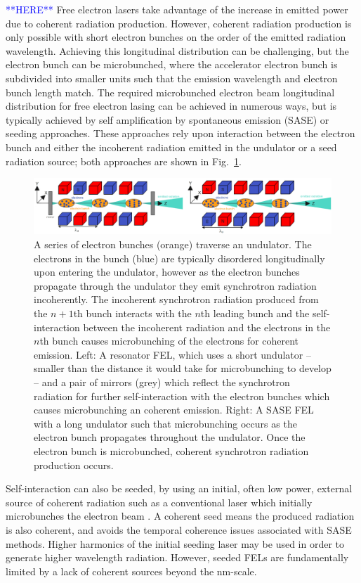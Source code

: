 \documentclass[../main.tex]{subfiles}
\begin{document}
\textcolor{blue}{**HERE**}
Free electron lasers take advantage of the increase in emitted power due to coherent radiation production. However, coherent radiation production is only possible with short electron bunches on the order of the emitted radiation wavelength. Achieving this longitudinal distribution can be challenging, but the electron bunch can be microbunched, where the accelerator electron bunch is subdivided into smaller units such that the emission wavelength and electron bunch length match. The required microbunched electron beam longitudinal distribution for free electron lasing can be achieved in numerous ways, but is typically achieved by self amplification by spontaneous emission (SASE) or seeding approaches. These approaches rely upon interaction between the electron bunch and either the incoherent radiation emitted in the undulator or a seed radiation source; both approaches are shown in Fig.~\ref{fig:FEL_microbunching}.
\begin{figure}[!h]
\centering
\includegraphics[width=\textwidth]{Figures/Introduction/FELs_microbunching.pdf}
\caption{A series of electron bunches (orange) traverse an undulator. The electrons in the bunch (blue) are typically disordered longitudinally upon entering the undulator, however as the electron bunches propagate through the undulator they emit synchrotron radiation incoherently. The incoherent synchrotron radiation produced from the $n+1$th bunch interacts with the $n$th leading bunch and the self-interaction between the incoherent radiation and the electrons in the $n$th bunch causes microbunching of the electrons for coherent emission. Left: A resonator FEL, which uses a short undulator -- smaller than the distance it would take for microbunching to develop -- and a pair of mirrors (grey) which reflect the synchrotron radiation for further self-interaction with the electron bunches which causes microbunching an coherent emission. Right: A SASE FEL with a long undulator such that microbunching occurs as the electron bunch propagates throughout the undulator. Once the electron bunch is microbunched, coherent synchrotron radiation production occurs. }
\label{fig:FEL_microbunching}
\end{figure}

Self-interaction can also be seeded, by using an initial, often low power, external source of coherent radiation such as a conventional laser which initially microbunches the electron beam \cite{allaria2012highly}. A coherent seed means the produced radiation is also coherent, and avoids the temporal coherence issues associated with SASE methods. Higher harmonics of the initial seeding laser may be used in order to generate higher wavelength radiation. However, seeded FELs are fundamentally limited by a lack of coherent sources beyond the \si{\nano\meter}-scale.
\end{document}
